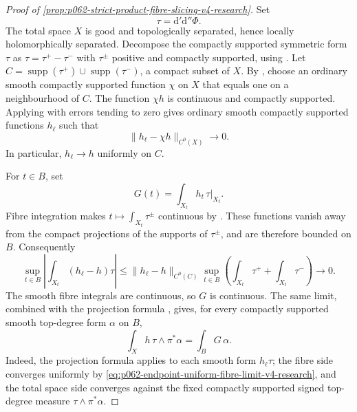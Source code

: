 \begin{proof}[Proof of
\cref{prop:p062-strict-product-fibre-slicing-v4-research}]
Set
\[
                         \tau=\mathrm d'\mathrm d''\Phi.
\]
The total space \(X\) is good and topologically separated, hence locally
holomorphically separated.  Decompose the compactly supported symmetric
form \(\tau\) as
\(
 \tau=\tau^+-\tau^-
\)
with \(\tau^\pm\) positive and compactly supported, using
\cite[Proposition~6.5.2(b)]{CLD25}.  Let
\(
 C=\operatorname{supp}(\tau^+)\cup\operatorname{supp}(\tau^-)
\), a compact subset of \(X\).  By
\cite[Corollary~15.2.5]{CLD25}, choose an ordinary smooth compactly
supported function \(\chi\) on \(X\) that equals one on a neighbourhood of
\(C\).  The function \(\chi h\) is continuous and compactly supported.
Applying \cite[Theorem~15.2.6]{CLD25} with errors tending to zero gives
ordinary smooth compactly supported functions \(h_\ell\) such that
\begin{equation}\label{eq:p062-endpoint-cutoff-approximation-v4-research}
 \lVert h_\ell-\chi h\rVert_{C^0(X)}\longrightarrow0.
\end{equation}
In particular, \(h_\ell\to h\) uniformly on \(C\).

For \(t\in B\), set
\[
                 G(t)=\int_{X_t}h_t\,\tau|_{X_t}.
\]
Fibre integration makes
\(
 t\mapsto\int_{X_t}\tau^\pm
\)
continuous by \cite[Theorem~16.3.3(d)]{CLD25}.  These functions vanish
away from the compact projections of the supports of \(\tau^\pm\), and are
therefore bounded on \(B\).  Consequently
\begin{equation}\label{eq:p062-endpoint-uniform-fibre-limit-v4-research}
 \sup_{t\in B}\left|
   \int_{X_t}(h_\ell-h)\tau\right|
 \leq \lVert h_\ell-h\rVert_{C^0(C)}
       \sup_{t\in B}\left(\int_{X_t}\tau^++\int_{X_t}\tau^-\right)
 \longrightarrow0.
\end{equation}
The smooth fibre integrals are continuous, so \(G\) is continuous.  The
same limit, combined with the projection formula
\cite[Theorem~16.5.4 and Corollary~16.5.5]{CLD25}, gives, for every
compactly supported smooth top-degree form \(\alpha\) on \(B\),
\begin{equation}\label{eq:p062-endpoint-continuous-fubini-v4-research}
 \int_X h\,\tau\wedge\pi^*\alpha
                         =\int_B G\,\alpha.
\end{equation}
Indeed, the projection formula applies to each smooth form
\(h_\ell\tau\); the fibre side converges uniformly by
\eqref{eq:p062-endpoint-uniform-fibre-limit-v4-research}, and the total
space side converges against the fixed compactly supported signed
top-degree measure \(\tau\wedge\pi^*\alpha\).


\end{proof}
